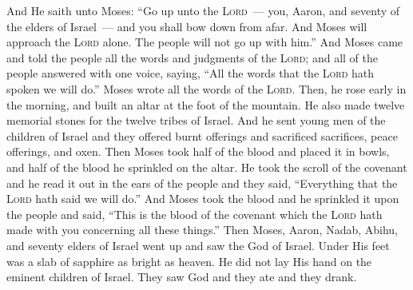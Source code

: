 
\begin{inparaenum}
     And He saith unto Moses: ``Go up unto the \textsc{Lord}~--- you, Aaron, and seventy of the elders of Israel~--- and you shall bow down from afar.%
     And Moses will approach the \textsc{Lord} alone. The people will not go up with him.''%
     And Moses came and told the people all the words and judgments of the \textsc{Lord}; and all of the people answered with one voice, saying, ``All the words that the \textsc{Lord} hath spoken we will do.''%
     Moses wrote all the words of the \textsc{Lord}. Then, he rose early in the morning, and built an altar at the foot of the mountain. He also made twelve memorial stones for the twelve tribes of Israel.%
     And he sent young men of the children of Israel and they offered burnt offerings and sacrificed sacrifices, peace offerings, and oxen.%
     Then Moses took half of the blood and placed it in bowls, and half of the blood he sprinkled on the altar.%
     He took the scroll of the covenant and he read it out in the ears of the people and they said, ``Everything that the \textsc{Lord} hath said we will do.''%
     And Moses took the blood and he sprinkled it upon the people and said, ``This is the blood of the covenant which the \textsc{Lord} hath made with you concerning all these things.''%
     Then Moses, Aaron, Nadab, Abihu, and seventy elders of Israel went up%
     and saw the God of Israel. Under His feet was a slab of sapphire as bright as heaven.%
     He did not lay His hand on the eminent children of Israel. They saw God and they ate and they drank.%
    

\end{inparaenum}

